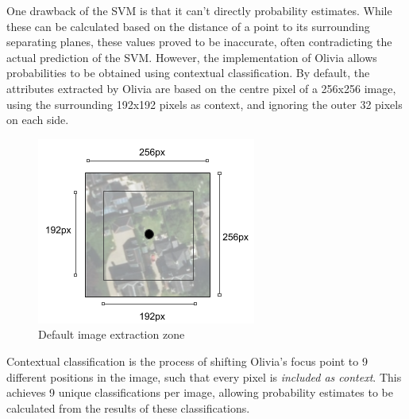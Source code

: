 One drawback of the SVM is that it can’t directly probability estimates. While these can be calculated based on the distance of a point to its surrounding separating planes, these values proved to be inaccurate, often contradicting the actual prediction of the SVM.  However, the implementation of Olivia allows probabilities to be obtained using contextual classification. By default, the attributes extracted by Olivia are based on the centre pixel of a 256x256 image, using the surrounding 192x192 pixels as context, and ignoring the outer 32 pixels on each side.

\begin{figure}[H]
    \centering
    \includegraphics{figs/7/tile_range}
    \caption{Default image extraction zone}
\end{figure}

Contextual classification is the process of shifting Olivia’s focus point to 9 different positions in the image, such that every pixel is \textit{included as context}. This achieves 9 unique classifications per image, allowing probability estimates to be calculated from the results of these classifications.

